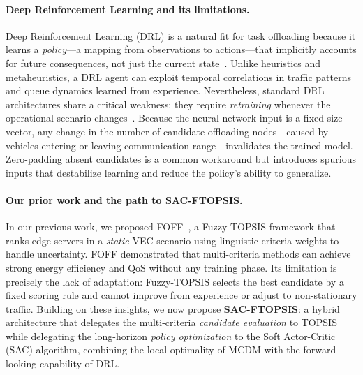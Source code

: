 \documentclass[iicol]{sn-jnl}
\begin{document}
\paragraph{Deep Reinforcement Learning and its limitations.}
Deep Reinforcement Learning (DRL) is a natural fit for task offloading because
it learns a \emph{policy}—a mapping from observations to actions—that implicitly
accounts for future consequences, not just the current state~\cite{huang2020,shi2023}.
Unlike heuristics and metaheuristics, a DRL agent can exploit temporal
correlations in traffic patterns and queue dynamics learned from experience.
Nevertheless, standard DRL architectures share a critical weakness: they
require \emph{retraining} whenever the operational scenario
changes~\cite{miriyala2026dl_offload_review}.
Because the neural network input is a fixed-size vector, any change in the
number of candidate offloading nodes—caused by vehicles entering or leaving
communication range—invalidates the trained model.
Zero-padding absent candidates is a common workaround but introduces spurious
inputs that destabilize learning and reduce the policy's ability to generalize.

\paragraph{Our prior work and the path to SAC-FTOPSIS.}
In our previous work, we proposed FOFF~\cite{vieira2025foff}, a
Fuzzy-TOPSIS framework that ranks edge servers in a \emph{static} VEC scenario
using linguistic criteria weights to handle uncertainty.
FOFF demonstrated that multi-criteria methods can achieve strong energy
efficiency and QoS without any training phase.
Its limitation is precisely the lack of adaptation: Fuzzy-TOPSIS selects the
best candidate by a fixed scoring rule and cannot improve from experience or
adjust to non-stationary traffic.
Building on these insights, we now propose \textbf{SAC-FTOPSIS}: a hybrid
architecture that delegates the multi-criteria \emph{candidate evaluation}
to TOPSIS while delegating the long-horizon \emph{policy optimization} to the
Soft Actor-Critic (SAC) algorithm, combining the local optimality of MCDM with
the forward-looking capability of DRL.
\end{document}
